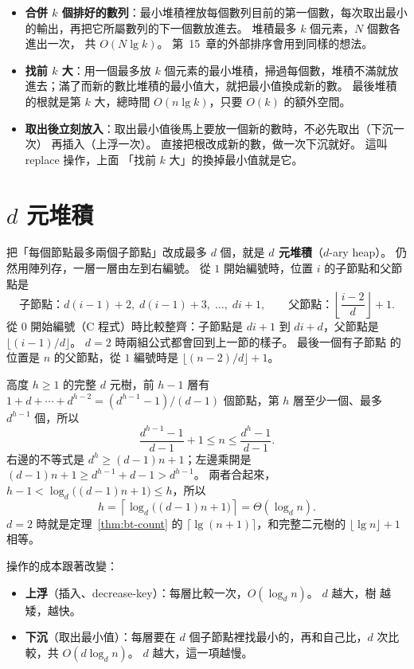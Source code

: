 \begin{itemize}
\item \textbf{合併 $k$ 個排好的數列}：最小堆積裡放每個數列目前的第一個數，每次取出最小
的輸出，再把它所屬數列的下一個數放進去。 堆積最多 $k$ 個元素，$N$ 個數各進出一次，
共 $O(N \lg k)$。 第~15~章的外部排序會用到同樣的想法。
\item \textbf{找前 $k$ 大}：用一個最多放 $k$ 個元素的最小堆積，掃過每個數，堆積不滿就放
進去；滿了而新的數比堆積的最小值大，就把最小值換成新的數。 最後堆積的根就是第 $k$
大，總時間 $O(n \lg k)$，只要 $O(k)$ 的額外空間。
\item \textbf{取出後立刻放入}：取出最小值後馬上要放一個新的數時，不必先取出（下沉一次）
再插入（上浮一次）。 直接把根改成新的數，做一次下沉就好。 這叫 replace 操作，上面
「找前 $k$ 大」的換掉最小值就是它。
\end{itemize}

\section{$d$ 元堆積}
\label{sec:hp-dary}

把「每個節點最多兩個子節點」改成最多 $d$ 個，就是 \textbf{$d$ 元堆積}（$d$-ary heap）。
仍然用陣列存，一層一層由左到右編號。 從 $1$ 開始編號時，位置 $i$ 的子節點和父節點是
\[
\text{子節點：} d(i - 1) + 2,\; d(i - 1) + 3,\; \ldots,\; di + 1, \qquad
\text{父節點：} \left\lfloor \frac{i - 2}{d} \right\rfloor + 1.
\]
從 $0$ 開始編號（C 程式）時比較整齊：子節點是 $di + 1$ 到 $di + d$，父節點是
$\lfloor (i - 1)/d \rfloor$。 $d = 2$ 時兩組公式都會回到上一節的樣子。 最後一個有子節點
的位置是 $n$ 的父節點，從 $1$ 編號時是 $\lfloor (n - 2)/d \rfloor + 1$。

高度 $h \ge 1$ 的完整 $d$ 元樹，前 $h - 1$ 層有
$1 + d + \cdots + d^{h-2} = (d^{h-1} - 1)/(d - 1)$ 個節點，第 $h$ 層至少一個、最多
$d^{h-1}$ 個，所以
\[
\frac{d^{h-1} - 1}{d - 1} + 1 \le n \le \frac{d^h - 1}{d - 1}.
\]
右邊的不等式是 $d^h \ge (d - 1)n + 1$；左邊乘開是 $(d - 1)n + 1 \ge d^{h-1} + d - 1 >
d^{h-1}$。 兩者合起來，$h - 1 < \log_d\bigl((d - 1)n + 1\bigr) \le h$，所以
\[
h = \left\lceil \log_d \bigl((d - 1)n + 1\bigr) \right\rceil = \Theta(\log_d n).
\]
$d = 2$ 時就是定理~\ref{thm:bt-count} 的 $\lceil \lg(n + 1) \rceil$，和完整二元樹的
$\lfloor \lg n \rfloor + 1$ 相等。

操作的成本跟著改變：

\begin{itemize}
\item \textbf{上浮}（插入、decrease-key）：每層比較一次，$O(\log_d n)$。 $d$ 越大，樹
越矮，越快。
\item \textbf{下沉}（取出最小值）：每層要在 $d$ 個子節點裡找最小的，再和自己比，$d$
次比較，共 $O(d \log_d n)$。 $d$ 越大，這一項越慢。
\end{itemize}

